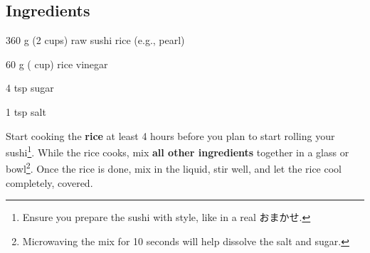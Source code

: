 \newpage
{}

	\subsection*{Ingredients}
\begin{ingredients}
	\item 360 g (2 cups) raw sushi rice (e.g., pearl)
	\item 60 g ( cup) rice vinegar
	\item 4 tsp sugar
	\item 1 tsp salt
\end{ingredients}

\medskip

Start cooking the \textbf{rice} at least 4 hours before you plan to start rolling your sushi\footnote{Ensure you prepare the sushi with style, like in a real {\japanesefont おまかせ.}}.
While the rice cooks, mix \textbf{all other ingredients} together in a glass or bowl\footnote{Microwaving the mix for 10 seconds will help dissolve the salt and sugar.}.
Once the rice is done, mix in the liquid, stir well, and let the rice cool completely, covered.

\vspace*{0.75 cm}

\begin{recipeblock}
	
\end{recipeblock}
